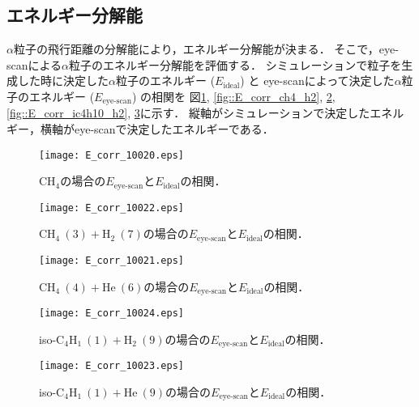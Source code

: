 \documentclass[../master]{subfiles}
\begin{document}
\subsection{エネルギー分解能}
$\alpha$粒子の飛行距離の分解能により，エネルギー分解能が決まる．
そこで，eye-scanによる$\alpha$粒子のエネルギー分解能を評価する．
シミュレーションで粒子を生成した時に決定した$\alpha$粒子のエネルギー ($E_{\text{ideal}}$) と
eye-scanによって決定した$\alpha$粒子のエネルギー ($E_{\text{eye-scan}}$) の相関を
図\ref{fig::E_corr_ch4}, \ref{fig::E_corr_ch4_h2}, \ref{fig::E_corr_ch4_he},
\ref{fig::E_corr_ic4h10_h2}, \ref{fig::E_corr_ic4h10_he}に示す．
縦軸がシミュレーションで決定したエネルギー，横軸がeye-scanで決定したエネルギーである．
\begin{figure}
  \centering
  \begin{minipage}{0.45\columnwidth}
    \centering
    \texttt{[image: E\_corr\_10020.eps]}
    \caption{$\mathrm{CH}_{4}$の場合の$E_{\text{eye-scan}}$と$E_{\text{ideal}}$の相関．}
    \label{fig::E_corr_ch4}
  \end{minipage}  
\end{figure}
\begin{figure}
  \centering
  \begin{minipage}{0.45\columnwidth}
    \centering
    \texttt{[image: E\_corr\_10022.eps]}
    \caption{$\mathrm{CH}_{4}\ (3) + \mathrm{H}_{2}\ (7)$の場合の$E_{\text{eye-scan}}$と$E_{\text{ideal}}$の相関．}
    \label{fig::E_corr_ch4_h2}
  \end{minipage}
  \begin{minipage}{0.45\columnwidth}
    \centering
    \texttt{[image: E\_corr\_10021.eps]}
    \caption{$\mathrm{CH}_{4}\ (4) + \mathrm{He}\ (6)$の場合の$E_{\text{eye-scan}}$と$E_{\text{ideal}}$の相関．}
    \label{fig::E_corr_ch4_he}
  \end{minipage}
\end{figure}
\begin{figure}
  \centering
  \begin{minipage}{0.45\columnwidth}
    \centering
    \texttt{[image: E\_corr\_10024.eps]}
    \caption{iso-$\mathrm{C}_{4}\mathrm{H}_{1}\ (1) + \mathrm{H}_{2}\ (9)$の場合の$E_{\text{eye-scan}}$と$E_{\text{ideal}}$の相関．}
    \label{fig::E_corr_ic4h10_h2}
  \end{minipage}
  \begin{minipage}{0.45\columnwidth}
    \centering
    \texttt{[image: E\_corr\_10023.eps]}
    \caption{iso-$\mathrm{C}_{4}\mathrm{H}_{1}\ (1) + \mathrm{He}\ (9)$の場合の$E_{\text{eye-scan}}$と$E_{\text{ideal}}$の相関．}
    \label{fig::E_corr_ic4h10_he}
  \end{minipage}
\end{figure}
\end{document}

